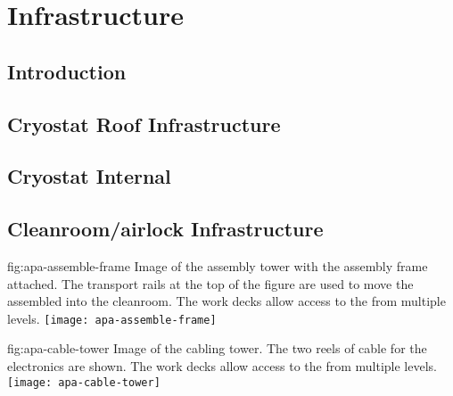 \section{Infrastructure}
\label{sec:fdsp-tc-infr}


\subsection{Introduction}
\label{sec:fdsp-tc-infr-intro}



\subsection{Cryostat Roof Infrastructure}
\label{sec:fdsp-tc-infr-cryo-roof}

\subsection{Cryostat Internal}
\label{sec:fdsp-tc-infr-cryo-int}


\subsection{Cleanroom/airlock Infrastructure}
\label{sec:fdsp-tc-infr-comm}

\begin{dunefigure}{fig:apa-assemble-frame}
  {Image of the  assembly tower with the  assembly frame attached. The transport rails at the top of the figure are used to move the assembled  into the cleanroom. The work decks allow access to the  from multiple levels. }
\texttt{[image: apa-assemble-frame]}
\end{dunefigure}


\begin{dunefigure}{fig:apa-cable-tower}
  {Image of the  cabling tower. The two reels of cable for the electronics are shown. The work decks allow access to the  from multiple levels. }
\texttt{[image: apa-cable-tower]}
\end{dunefigure}



